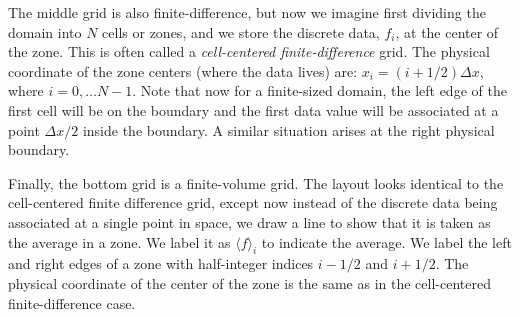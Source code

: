 The middle grid is also finite-difference, but now we imagine first
dividing the domain into $N$ cells or zones, and we store the discrete
data, $f_i$, at the center of the zone.  This is often called a {\em
  cell-centered finite-difference} grid.  The physical coordinate of
the zone centers (where the data lives) are: $x_i = (i + 1/2)\Delta
x$, where $i = 0, \ldots N-1$.  Note that now for a finite-sized
domain, the left edge of the first cell will be on the boundary and
the first data value will be associated at a point $\Delta x/2$ inside
the boundary.  A similar situation arises at the right physical
boundary.

Finally, the bottom grid is a finite-volume grid.  The layout looks
identical to the cell-centered finite difference grid, except now
instead of the discrete data being associated at a single point in
space, we draw a line to show that it is taken as the average in a
zone.  We label it as $\langle f\rangle_i$ to indicate the average.
We label the left and right edges of a zone with half-integer indices
$i-1/2$ and $i+1/2$.  The physical coordinate of the center of the zone
is the same as in the cell-centered finite-difference case.


